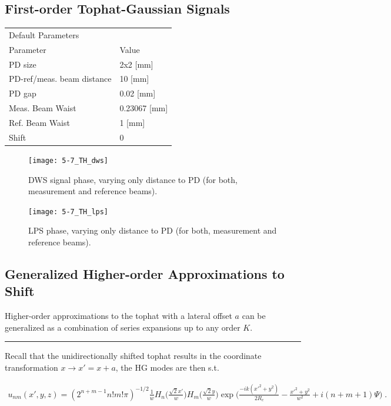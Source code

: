 \documentclass[aps,twoside,secnumarabic,balancelastpage,amsmath,amssymb,nofootinbib,hyperref=pdftex]{revtex4}
\begin{document}
\subsection{First-order Tophat-Gaussian Signals}

\begin{table}[ht]
\begin{tabular}{ll}
\multicolumn{2}{l}{Default Parameters}        \\
Parameter                  & Value            \\
PD size                    & 2x2 {[}mm{]}     \\
PD-ref/meas. beam distance & 10 {[}mm{]}      \\
PD gap                     & 0.02 {[}mm{]}    \\
Meas. Beam Waist           & 0.23067 {[}mm{]} \\
Ref. Beam Waist            & 1 {[}mm{]}       \\
Shift                      & 0               
\end{tabular}
\end{table}

	\begin{figure}[ht]
	\centering
		\texttt{[image: 5-7\_TH\_dws]}
		\caption{DWS signal phase, varying only distance to PD (for both, measurement and reference beams).}
		\label{fig:TH_DWS}
	\end{figure}


	\begin{figure}[hb]
	\centering
		\texttt{[image: 5-7\_TH\_lps]}
		\caption{LPS phase, varying only distance to PD (for both, measurement and reference beams).}
		\label{fig:TH_DWS}
	\end{figure}
	
\clearpage

\subsection{Generalized Higher-order Approximations to Shift }

Higher-order approximations to the tophat with a lateral offset $a$ can be generalized as a combination of series expansions up to any order $K$.

\rule{\textwidth}{0.4pt}

Recall that the unidirectionally shifted tophat results in the coordinate transformation $x\rightarrow x' = x+a$, the HG modes are then s.t.

\begin{align*}
	u_{nm}(x',y,z) =
		(2^{n+m-1}n!m!\pi)^{-1/2}
		\frac{1}{w}
		H_{n} \Big(\frac{\sqrt{2}x'}{w} \Big)
		H_{m} \Big(\frac{\sqrt{2}y}{w} \Big)
		\exp \Big(\frac{-ik(x'^{2}+y^{2})}{2R_{c}}-
		\frac{x'^{2}+y^{2}}{w^{2}} 
		+i(n+m+1)\Psi
		\Big)\;
		.
\end{align*}
\end{document}
